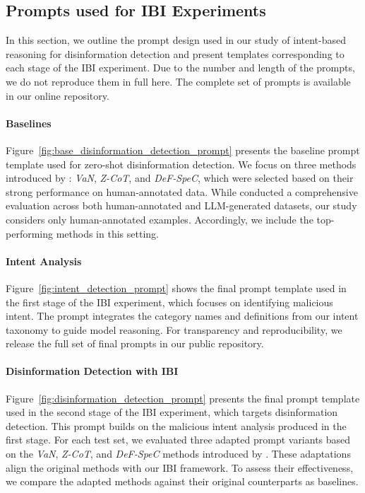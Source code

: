 \documentclass[11pt]{article}
\begin{document}
\subsection{Prompts used for IBI Experiments}
\label{sec:prompts}

In this section, we outline the prompt design used in our study of intent-based reasoning for disinformation detection and present templates corresponding to each stage of the IBI experiment. Due to the number and length of the prompts, we do not reproduce them in full here. The complete set of prompts is available in our online repository.

\paragraph{Baselines}
\label{sec:prompt_baseline}

Figure~\ref{fig:base_disinformation_detection_prompt} presents the baseline prompt template used for zero-shot disinformation detection. We focus on three methods introduced by \citet{lucas2023fighting}: \textit{VaN}, \textit{Z-CoT}, and \textit{DeF-SpeC}, which were selected based on their strong performance on human-annotated data. While \citet{lucas2023fighting} conducted a comprehensive evaluation across both human-annotated and LLM-generated datasets, our study considers only human-annotated examples. Accordingly, we include the top-performing methods in this setting.


\paragraph{Intent Analysis}
\label{sec:prompt_intent_analysis}

Figure~\ref{fig:intent_detection_prompt} shows the final prompt template used in the first stage of the IBI experiment, which focuses on identifying malicious intent. The prompt integrates the category names and definitions from our intent taxonomy to guide model reasoning. For transparency and reproducibility, we release the full set of final prompts in our public repository.


\paragraph{Disinformation Detection with IBI}
\label{sec:prompt_ibi_final}

Figure~\ref{fig:disinformation_detection_prompt} presents the final prompt template used in the second stage of the IBI experiment, which targets disinformation detection. This prompt builds on the malicious intent analysis produced in the first stage. For each test set, we evaluated three adapted prompt variants based on the \textit{VaN}, \textit{Z-CoT}, and \textit{DeF-SpeC} methods introduced by \citet{lucas2023fighting}. These adaptations align the original methods with our IBI framework. To assess their effectiveness, we compare the adapted methods against their original counterparts as baselines.
\end{document}
